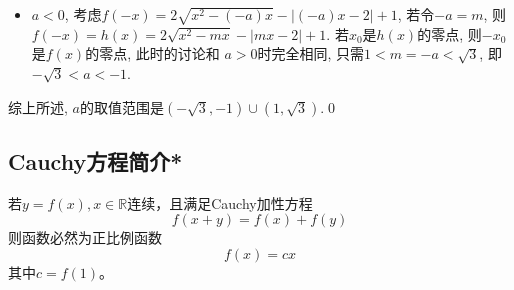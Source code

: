 \begin{jie}
\begin{itemize}
\begin{enumerate}
            其中\(g(a)=(a^2-4)a^2-2a^2+9=(a^2-3)^2\geq 0\).
            \begin{enumerate}
                \item \(a=\sqrt{3}\)时, 则\(x=a=\sqrt{3}\)是\(g(x)\)的零点, 更是\(f(x)\)的零点.不符合题意. 
                \item 当\(a >\sqrt{3}\),此时\(\frac{3}{a}< a\),\(g(a)>0\).
                由于\(g(x)\)的图像是开口向下的抛物线, 因此
                因此\(g(x)=0\)的两根\(\frac{a\pm 2\sqrt{9-2a^2}}{a^2-4}\)中较小的那个
                一定比\(a\)小, 较大的那个根\(\frac{a- 2\sqrt{9-2a^2}}{a^2-4}\)比\(a\)大,
                是\(f(x)\)的零点, 不满足题意.
                \item 当\(a\leq \sqrt{3}\), 此时\(a<\frac{3}{a}\), 计算
                \[g(\frac{3}{a})=\frac{12(a^2-3)}{a^2}<0,\]
                即\(x\geq \frac{3}{a}\)时, \(g(x)\)没有零点, \(f(x)\)也就没有零点.符合题意.
            \end{enumerate}
        \end{enumerate}
        即\(a>0\)时, \(1<a<\sqrt{3}\)是符合题意的.
        \item \(a<0\), 考虑\(f(-x)=2\sqrt{x^2-(-a)x}-|(-a)x-2|+1\),
        若令\(-a=m\), 则\(f(-x)=h(x)=2\sqrt{x^2-mx}-|mx-2|+1\).
        若\(x_0\)是\(h(x)\)的零点, 则\(-x_0\)是\(f(x)\)的零点, 此时的讨论和
        \(a>0\)时完全相同, 只需\(1<m=-a<\sqrt{3}\), 即\(-\sqrt{3}<a<-1\).
    \end{itemize}
    综上所述, \(a\)的取值范围是\((-\sqrt{3},-1)\cup(1,\sqrt{3})\).\qed

\end{jie}




\clearpage
\subsection{Cauchy方程简介*}
\begin{theorem}
    若\(y=f(x), x\in \mathbb{R}\)连续，且满足Cauchy加性方程
    \begin{equation}
        f(x+y)=f(x)+f(y)
    \end{equation}
    则函数必然为正比例函数\[f(x)=cx\]
    其中\(c=f(1)\)。
\end{theorem}
\clearpage
